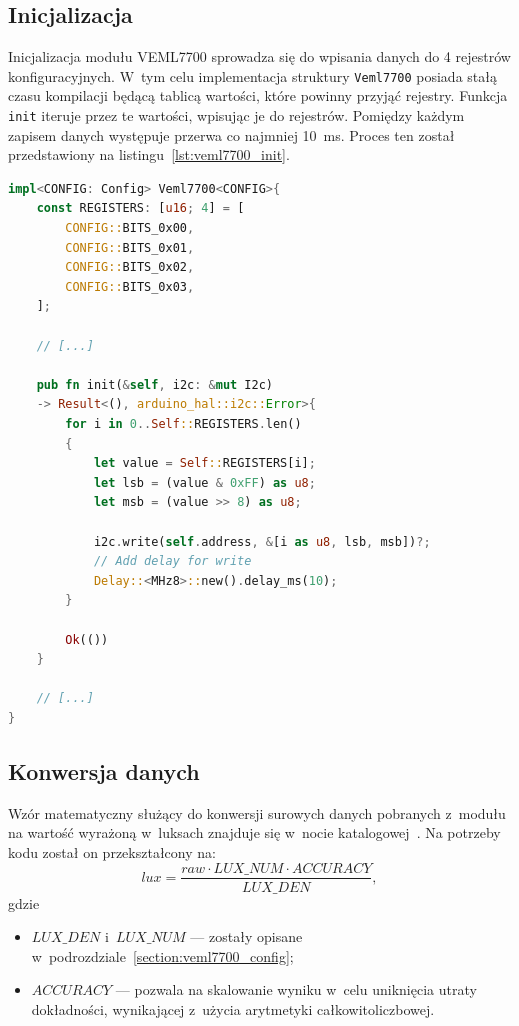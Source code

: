 \subsection*{Inicjalizacja}
Inicjalizacja modułu VEML7700 sprowadza się do wpisania danych
do 4 rejestrów konfiguracyjnych. W~tym celu implementacja 
struktury \texttt{Veml7700} posiada stałą czasu kompilacji
będącą tablicą wartości, które powinny przyjąć rejestry.
Funkcja \texttt{init} iteruje przez te wartości, wpisując 
je do rejestrów. Pomiędzy każdym zapisem danych występuje
przerwa co najmniej \SI{10}{\milli\second}. Proces ten został
przedstawiony na listingu~\ref{lst:veml7700_init}.


\begin{lstlisting}[language=Rust, style=colouredRust, 
    caption={Funkcja \texttt{init} struktury \texttt{Veml7700}},
    label={lst:veml7700_init}
]
impl<CONFIG: Config> Veml7700<CONFIG>{
    const REGISTERS: [u16; 4] = [
        CONFIG::BITS_0x00,
        CONFIG::BITS_0x01,
        CONFIG::BITS_0x02,
        CONFIG::BITS_0x03,
    ];

    // [...]

    pub fn init(&self, i2c: &mut I2c) 
    -> Result<(), arduino_hal::i2c::Error>{
        for i in 0..Self::REGISTERS.len()
        {
            let value = Self::REGISTERS[i];
            let lsb = (value & 0xFF) as u8;
            let msb = (value >> 8) as u8;

            i2c.write(self.address, &[i as u8, lsb, msb])?;
            // Add delay for write
            Delay::<MHz8>::new().delay_ms(10);
        }

        Ok(())
    }

    // [...]
}
\end{lstlisting}

\subsection*{Konwersja danych}
Wzór matematyczny służący do konwersji surowych danych pobranych z~modułu na 
wartość wyrażoną w~luksach znajduje się w~nocie katalogowej~\cite{veml7700_datasheet}.
Na potrzeby kodu został on przekształcony na:
\begin{equation}
    lux = \frac{raw \cdot LUX\_NUM \cdot ACCURACY}{LUX\_DEN},
\end{equation}
\noindent gdzie 
\begin{itemize}
    \item $LUX\_DEN$ i~$LUX\_NUM$ --- zostały opisane w~podrozdziale~\ref{section:veml7700_config};
    \item $ACCURACY$ --- pozwala na skalowanie wyniku w~celu uniknięcia
    utraty dokładności, wynikającej z~użycia arytmetyki całkowitoliczbowej.
\end{itemize}

